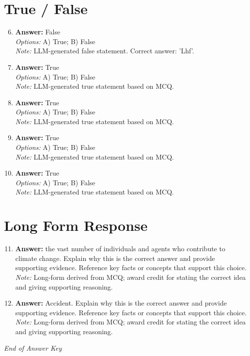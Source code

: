 \documentclass[12pt]{article}
\begin{document}
\section*{True / False}
\begin{enumerate}[label=\arabic*.]
\setcounter{enumi}{5}
\item \textbf{Answer:} False
\\ \textit{Options:} A) True; B) False
\\ \textit{Note:} LLM-generated false statement. Correct answer: 'Lhf'.
\item \textbf{Answer:} True
\\ \textit{Options:} A) True; B) False
\\ \textit{Note:} LLM-generated true statement based on MCQ.
\item \textbf{Answer:} True
\\ \textit{Options:} A) True; B) False
\\ \textit{Note:} LLM-generated true statement based on MCQ.
\item \textbf{Answer:} True
\\ \textit{Options:} A) True; B) False
\\ \textit{Note:} LLM-generated true statement based on MCQ.
\item \textbf{Answer:} True
\\ \textit{Options:} A) True; B) False
\\ \textit{Note:} LLM-generated true statement based on MCQ.
\end{enumerate}

\section*{Long Form Response}
\begin{enumerate}[label=\arabic*.]
\setcounter{enumi}{10}
\item \textbf{Answer:} the vast number of individuals and agents who contribute to climate change. Explain why this is the correct answer and provide supporting evidence. Reference key facts or concepts that support this choice.
\\ \textit{Note:} Long-form derived from MCQ; award credit for stating the correct idea and giving supporting reasoning.
\item \textbf{Answer:} Accident. Explain why this is the correct answer and provide supporting evidence. Reference key facts or concepts that support this choice.
\\ \textit{Note:} Long-form derived from MCQ; award credit for stating the correct idea and giving supporting reasoning.
\end{enumerate}

\vfill
\noindent\textit{End of Answer Key}
\end{document}
